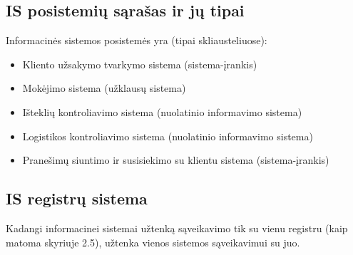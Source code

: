 \documentclass{VUMIFPSkursinis}
\begin{document}
\subsection{IS posistemių sąrašas ir jų tipai}
Informacinės sistemos posistemės yra (tipai skliausteliuose):
\begin{itemize}
    \item Kliento užsakymo tvarkymo sistema (sistema-įrankis)
    \item Mokėjimo sistema (užklausų sistema)
    \item Išteklių kontroliavimo sistema (nuolatinio informavimo sistema)
    \item Logistikos kontroliavimo sistema (nuolatinio informavimo sistema)
    \item Pranešimų siuntimo ir susisiekimo su klientu sistema (sistema-įrankis)
\end{itemize}

\newpage
\subsection{IS registrų sistema}
Kadangi informacinei sistemai užtenką sąveikavimo tik su vienu registru (kaip matoma skyriuje 2.5), užtenka vienos sistemos sąveikavimui su juo.
\end{document}
